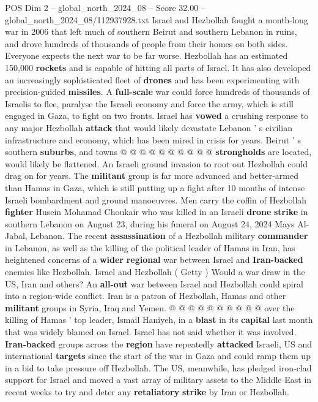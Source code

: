 \begin{textsample}{POS Dim 2 – global\_north\_2024\_08 – Score 32.00 – global\_north\_2024\_08/112937928.txt}
Israel and Hezbollah fought a month-long war in 2006 that left much of southern Beirut and southern Lebanon in ruins, and drove hundreds of thousands of people from their homes on both sides.
Everyone expects the next war to be far worse.
Hezbollah has an estimated 150,000 \textbf{rockets} and is capable of hitting all parts of Israel.
It has also developed an increasingly sophisticated fleet of \textbf{drones} and has been experimenting with precision-guided \textbf{missiles}.
A \textbf{full-scale} war could force hundreds of thousands of Israelis to flee, paralyse the Israeli economy and force the army, which is still engaged in Gaza, to fight on two fronts.
Israel has \textbf{vowed} a crushing response to any major Hezbollah \textbf{attack} that would likely devastate Lebanon ' s civilian infrastructure and economy, which has been mired in crisis for years.
Beirut ' s southern \textbf{suburbs}, and towns @ @ @ @ @ @ @ @ @ @ \textbf{strongholds} are located, would likely be flattened.
An Israeli ground invasion to root out Hezbollah could drag on for years.
The \textbf{militant} group is far more advanced and better-armed than Hamas in Gaza, which is still putting up a fight after 10 months of intense Israeli bombardment and ground manoeuvres.
Men carry the coffin of Hezbollah \textbf{fighter} Husein Mohamad Choukair who was killed in an Israeli \textbf{drone} \textbf{strike} in southern Lebanon on August 23, during his funeral on August 24, 2024 Mays Al-Jabal, Lebanon.
The recent \textbf{assassination} of a Hezbollah military \textbf{commander} in Lebanon, as well as the killing of the political leader of Hamas in Iran, has heightened concerns of a \textbf{wider} \textbf{regional} war between Israel and \textbf{Iran-backed} enemies like Hezbollah.
Israel and Hezbollah ( Getty ) Would a war draw in the US, Iran and others?
An \textbf{all-out} war between Israel and Hezbollah could spiral into a region-wide conflict.
Iran is a patron of Hezbollah, Hamas and other \textbf{militant} groups in Syria, Iraq and Yemen. @ @ @ @ @ @ @ @ @ @ over the killing of Hamas ' top leader, Ismail Haniyeh, in a \textbf{blast} in its \textbf{capital} last month that was widely blamed on Israel.
Israel has not said whether it was involved. \textbf{Iran-backed} groups across the \textbf{region} have repeatedly \textbf{attacked} Israeli, US and international \textbf{targets} since the start of the war in Gaza and could ramp them up in a bid to take pressure off Hezbollah.
The US, meanwhile, has pledged iron-clad support for Israel and moved a vast array of military assets to the Middle East in recent weeks to try and deter any \textbf{retaliatory} \textbf{strike} by Iran or Hezbollah.

\end{textsample}
